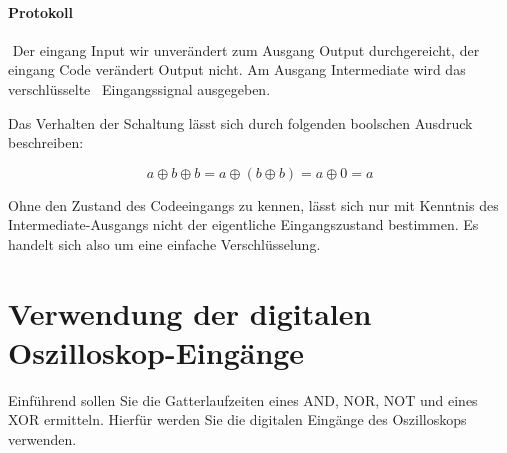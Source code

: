 \documentclass[10pt]{scrreprt}
\begin{document}
    \paragraph{Protokoll}
    $ $
    Der eingang Input wir unverändert zum Ausgang Output durchgereicht, der eingang
    Code verändert Output nicht. Am Ausgang Intermediate wird das \glqq{}verschlüsselte\grqq
    ~Eingangssignal ausgegeben.

    Das Verhalten der Schaltung lässt sich durch folgenden boolschen Ausdruck
    beschreiben:

    \begin{equation*}
        a \oplus b \oplus b = a \oplus (b \oplus b)
        = a \oplus 0 = a
    \end{equation*}

    Ohne den Zustand des Codeeingangs zu kennen, lässt sich nur mit Kenntnis des
    Intermediate-Ausgangs nicht der eigentliche Eingangszustand bestimmen. Es handelt
    sich also um eine einfache Verschlüsselung.

    \section{Verwendung der digitalen Oszilloskop-Eingänge}
    Einführend sollen Sie die Gatterlaufzeiten eines AND, NOR, NOT und eines XOR
    ermitteln. Hierfür werden Sie die digitalen Eingänge des Oszilloskops verwenden.
\end{document}
